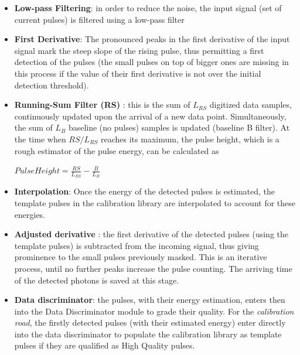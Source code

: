 \documentclass[11pt,twoside]{article}
\begin{document}
\begin{itemize}
 \item \textbf{Low-pass Filtering}: in order to reduce the noise, the input signal (set of current pulses) is filtered using a low-pass filter
 \item \textbf{First Derivative}: The pronounced peaks in the first derivative of the input signal mark the steep slope of the rising pulse, thus 
 permitting a first detection of the pulses (the small pulses on top of bigger ones are missing in this process if the value of their first
 derivative is not over the initial detection threshold).
 \item \textbf{Running-Sum Filter (RS)} \citep{RS_2011}: this is the sum of $L_{RS}$ digitized data samples, continuously updated upon the arrival 
 of a new data point. Simultaneously, the sum of $L_B$ baseline (no pulses) samples is updated (baseline B filter).
 At the time when $RS/L_{RS}$ reaches its maximum, the pulse height, which is a rough estimator of the pulse energy, can 
 be calculated as 
 
 $ PulseHeight = \frac{RS}{L_{RS}} - \frac{B}{L_B} $
 
 \item \textbf{Interpolation}: Once the energy of the detected pulses is estimated, the template pulses in the calibration library are interpolated to account 
 for these energies.
 \item \textbf{Adjusted derivative} \citep{Boyce_1999}: the first derivative of the detected pulses (using the template pulses) is subtracted from the incoming signal, thus 
 giving prominence to the small pulses previously masked. This is an iterative process, until no further peaks increase the pulse counting.
 The arriving time of the detected photons is saved at this stage. 
 \item \textbf{Data discriminator}: the pulses, with their energy estimation, enters then into the Data Discriminator module to grade their quality. For 
 the \textit{calibration road}, the firstly detected pulses (with their estimated energy) enter directly into the data discriminator to populate the
 calibration library as template pulses if they are qualified as High Quality pulses.
\end{itemize}
\end{document}
